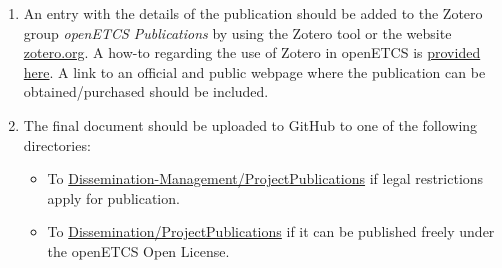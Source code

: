 \documentclass{template/openetcs_article}
\begin{document}
\begin{enumerate}
\item An entry with the details of the publication should be added to the Zotero group \emph{openETCS Publications} by using the Zotero tool or the website \href{http://www.zotero.org}{zotero.org}. A how-to regarding the use of Zotero in openETCS is \href{https://github.com/openETCS/Dissemination/wiki/Management-of-Publications-and-References-with-Zotero}{provided here}. A link to an official and public webpage where the publication can be obtained/purchased should be included.

\item The final document should be uploaded to GitHub to one of the following directories:
  \begin{itemize}
    \item To \href{https://github.com/openETCS/dissemination-management/tree/master/ProjectPublications}{Dissemination-Management/ProjectPublications} if legal restrictions apply for publication.
    \item To \href{https://github.com/openETCS/Dissemination/tree/master/ProjectPublications}{Dissemination/ProjectPublications} if it can be published freely under the openETCS Open License.
  \end{itemize}
\end{enumerate}
\end{document}
